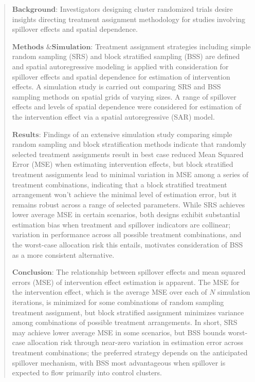 \documentclass{article}[11pt]
\begin{document}
\begin{abstract}
   $\textbf{Background}$: Investigators designing cluster randomized trials desire insights directing treatment assignment methodology for studies involving spillover effects and spatial dependence.

   $\textbf{Methods \& Simulation}$: Treatment assignment strategies including simple random sampling (SRS) and block stratified sampling (BSS) are defined and spatial autoregressive modeling is applied with consideration for spillover effects and spatial dependence for estimation of intervention effects. A simulation study is carried out comparing SRS and BSS sampling methods on spatial grids of varying sizes. A range of spillover effects and levels of spatial dependence were considered for estimation of the intervention effect via a spatial autoregressive (SAR) model.


   $\textbf{Results}$: Findings of an extensive simulation study comparing simple random sampling and block stratification methods indicate that randomly selected treatment assignments result in best case reduced Mean Squared Error (MSE) when estimating intervention effects, but block stratified treatment assignments lead to minimal variation in MSE among a series of treatment combinations, indicating that a block stratified treatment arrangement won’t achieve the minimal level of estimation error, but it remains robust across a range of selected parameters. While SRS achieves lower average MSE in certain scenarios, both designs exhibit substantial estimation bias when treatment and spillover indicators are collinear; variation in performance across all possible treatment combinations, and the worst-case allocation risk this entails, motivates consideration of BSS as a more consistent alternative.


   $\textbf{Conclusion}$: The relationship between spillover effects and mean squared errors (MSE) of intervention effect estimation is apparent. The MSE for the intervention effect, which is the average MSE over each of $N$ simulation iterations, is minimized for some combinations of random sampling treatment assignment, but block stratified assignment minimizes variance among combinations of possible treatment arrangements. In short, SRS may achieve lower average MSE in some scenarios, but BSS bounds worst-case allocation risk through near-zero variation in estimation error across treatment combinations; the preferred strategy depends on the anticipated spillover mechanism, with BSS most advantageous when spillover is expected to flow primarily into control clusters.
\end{abstract}
\end{document}
